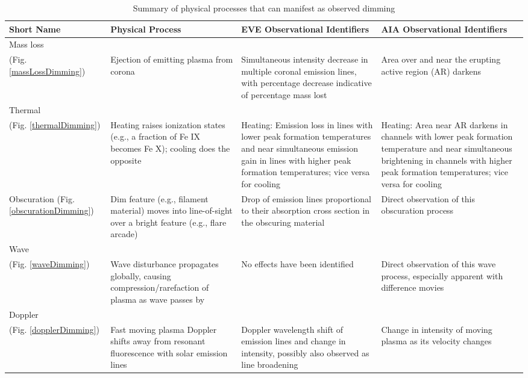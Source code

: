 \begin{table}[!h]
    \caption{Summary of physical processes that can manifest as observed dimming}
    \begin{center}
    \begin{tabular}{|p{2.5cm}|p{4cm}|p{4cm}|p{4cm}|} \hline
	Short Name & Physical Process & EVE Observational Identifiers & AIA Observational Identifiers \\ \hline \hline
	
	Mass loss \\ (Fig. \ref{massLossDimming}) & Ejection of emitting plasma from corona & Simultaneous intensity decrease in multiple coronal emission lines, with percentage decrease indicative of percentage mass lost & Area over and near the erupting active region (AR) darkens \\ \hline
	
	Thermal \\ (Fig. \ref{thermalDimming}) & Heating raises ionization states (e.g., a fraction of Fe IX becomes Fe X); cooling does the opposite & Heating: Emission loss in lines with lower peak formation temperatures and near simultaneous emission gain in lines with higher peak formation temperatures; vice versa for cooling & Heating: Area near AR darkens in channels with lower peak formation temperature and near simultaneous brightening in channels with higher peak formation temperatures; vice versa for cooling \\ \hline
	
	Obscuration (Fig. \ref{obscurationDimming}) & Dim feature (e.g., filament material) moves into line-of-sight over a bright feature (e.g., flare arcade) & Drop of emission lines proportional to their absorption cross section in the obscuring material & Direct observation of this obscuration process \\ \hline
	
	Wave \\ (Fig. \ref{waveDimming}) & Wave disturbance propagates globally, causing compression/rarefaction of plasma as wave passes by & No effects have been identified & Direct observation of this wave process, especially apparent with difference movies \\ \hline
	
	Doppler \\ (Fig. \ref{dopplerDimming}) & Fast moving plasma Doppler shifts away from resonant fluorescence with solar emission lines & Doppler wavelength shift of emission lines and change in intensity, possibly also observed as line broadening & Change in intensity of moving plasma as its velocity changes \\ \hline
	

\end{tabular}
\end{center}
\end{table}

